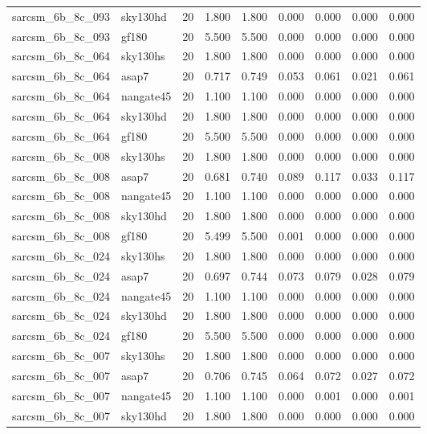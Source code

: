 \begin{tabular}{llrrrrrrr}
sarcsm\_6b\_8c\_093 & sky130hd & 20 & 1.800 & 1.800 & 0.000 & 0.000 & 0.000 & 0.000 \\
sarcsm\_6b\_8c\_093 & gf180 & 20 & 5.500 & 5.500 & 0.000 & 0.000 & 0.000 & 0.000 \\
sarcsm\_6b\_8c\_064 & sky130hs & 20 & 1.800 & 1.800 & 0.000 & 0.000 & 0.000 & 0.000 \\
sarcsm\_6b\_8c\_064 & asap7 & 20 & 0.717 & 0.749 & 0.053 & 0.061 & 0.021 & 0.061 \\
sarcsm\_6b\_8c\_064 & nangate45 & 20 & 1.100 & 1.100 & 0.000 & 0.000 & 0.000 & 0.000 \\
sarcsm\_6b\_8c\_064 & sky130hd & 20 & 1.800 & 1.800 & 0.000 & 0.000 & 0.000 & 0.000 \\
sarcsm\_6b\_8c\_064 & gf180 & 20 & 5.500 & 5.500 & 0.000 & 0.000 & 0.000 & 0.000 \\
sarcsm\_6b\_8c\_008 & sky130hs & 20 & 1.800 & 1.800 & 0.000 & 0.000 & 0.000 & 0.000 \\
sarcsm\_6b\_8c\_008 & asap7 & 20 & 0.681 & 0.740 & 0.089 & 0.117 & 0.033 & 0.117 \\
sarcsm\_6b\_8c\_008 & nangate45 & 20 & 1.100 & 1.100 & 0.000 & 0.000 & 0.000 & 0.000 \\
sarcsm\_6b\_8c\_008 & sky130hd & 20 & 1.800 & 1.800 & 0.000 & 0.000 & 0.000 & 0.000 \\
sarcsm\_6b\_8c\_008 & gf180 & 20 & 5.499 & 5.500 & 0.001 & 0.000 & 0.000 & 0.000 \\
sarcsm\_6b\_8c\_024 & sky130hs & 20 & 1.800 & 1.800 & 0.000 & 0.000 & 0.000 & 0.000 \\
sarcsm\_6b\_8c\_024 & asap7 & 20 & 0.697 & 0.744 & 0.073 & 0.079 & 0.028 & 0.079 \\
sarcsm\_6b\_8c\_024 & nangate45 & 20 & 1.100 & 1.100 & 0.000 & 0.000 & 0.000 & 0.000 \\
sarcsm\_6b\_8c\_024 & sky130hd & 20 & 1.800 & 1.800 & 0.000 & 0.000 & 0.000 & 0.000 \\
sarcsm\_6b\_8c\_024 & gf180 & 20 & 5.500 & 5.500 & 0.000 & 0.000 & 0.000 & 0.000 \\
sarcsm\_6b\_8c\_007 & sky130hs & 20 & 1.800 & 1.800 & 0.000 & 0.000 & 0.000 & 0.000 \\
sarcsm\_6b\_8c\_007 & asap7 & 20 & 0.706 & 0.745 & 0.064 & 0.072 & 0.027 & 0.072 \\
sarcsm\_6b\_8c\_007 & nangate45 & 20 & 1.100 & 1.100 & 0.000 & 0.001 & 0.000 & 0.001 \\
sarcsm\_6b\_8c\_007 & sky130hd & 20 & 1.800 & 1.800 & 0.000 & 0.000 & 0.000 & 0.000 \\

\end{tabular}
